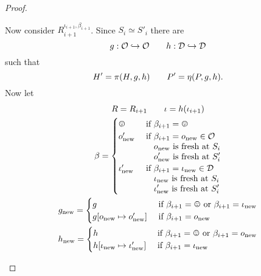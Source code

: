 \begin{proof}
\begin{description}
      Now consider $R_{i+1}^{\iota_{i+1}, \beta_{i+1}}$. Since $S_i \simeq
      S'_i$ there are
      \begin{equation*}
        g: \mathcal{O} \hookrightarrow \mathcal{O} \quad\quad h: \mathcal{D} \hookrightarrow \mathcal{D}
      \end{equation*}
      such that
      \begin{equation*}
        H' = \pi(H, g, h)  \quad\quad P' = \eta(P, g, h).
      \end{equation*}
      Now let 
      \begin{equation*}
        \begin{gathered}
          R = R_{i+1} \andalso \iota = h(\iota_{i+1}) \\
          \beta = 
          \begin{cases}
            \smiley         & \text{ if } \beta_{i+1} = \smiley \\
            o'_{\text{new}} & 
            \begin{aligned}[t]
              \text{ if }&\beta_{i+1} = o_{\text{new}} \in \OIDs \\
              &o_{\text{new}} \text{ is fresh at } S_i \\
              &o'_{\text{new}} \text{ is fresh at } S'_i 
            \end{aligned} \\
            \iota'_{\text{new}} & \begin{aligned}[t]
              \text{ if }&\beta_{i+1} = \iota_{\text{new}} \in \TIDs \\
              &\iota_{\text{new}} \text{ is fresh at } S_i \\
              &\iota'_{\text{new}} \text{ is fresh at } S'_i
            \end{aligned}
          \end{cases} \\
          g_{\text{new}} = 
          \begin{cases}
            g & \text{ if } \beta_{i+1} = \smiley \text{ or } \beta_{i+1} = 
            \iota_{\text{new}} \\
            g[o_{\text{new}} \mapsto o'_{\text{new}}] & \text{ if } \beta_{i+1}
            = o_{\text{new}}
          \end{cases} \\
          h_{\text{new}} = 
          \begin{cases}
            h & \text{ if } \beta_{i+1} = \smiley \text{ or } \beta_{i+1} = 
            o_{\text{new}} \\
            h[\iota_{\text{new}} \mapsto \iota'_{\text{new}}] & \text{ if } \beta_{i+1}
            = \iota_{\text{new}}
          \end{cases}
        \end{gathered}
      \end{equation*}


\end{description}
\end{proof}
